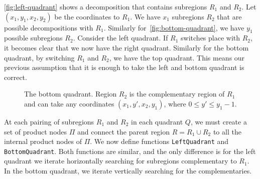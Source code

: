 \documentclass{amsart}
\theoremstyle{plain}
\numberwithin{equation}{section}
\newcommand{\code}[1]{\lstinline[mathescape=true]{#1}}
\begin{document}
\autoref{fig:left-quadrant} shows a decomposition that contains subregions $R_1$ and $R_2$. Let
$(x_1,y_1,x_2,y_2)$ be the coordinates to $R_1$. We have $x_1$ subregions $R_2$ that are possible
decompositions with $R_1$. Similarly for~\autoref{fig:bottom-quadrant}, we have $y_1$ possible
subregions $R_2$. Consider the left quadrant. If $R_1$ switches place with $R_2$, it becomes clear
that we now have the right quadrant. Similarly for the bottom quadrant, by switching $R_1$ and
$R_2$, we have the top quadrant. This means our previous assumption that it is enough to take the
left and bottom quadrant is correct.

\begin{figure}[h]
  \centering
  \captionsetup{justification=raggedright}
  \caption{The bottom quadrant. Region $R_2$ is the complementary region of $R_1$ and can take any
  coordinates $(x_1,y',x_2,y_1)$, where $0\leq y'\leq y_1-1$.\label{fig:bottom-quadrant}}
\end{figure}

At each pairing of subregions $R_1$ and $R_2$ in each quadrant $Q$, we must create a set of product
nodes $\Pi$ and connect the parent region $R=R_1\cup R_2$ to all the internal product nodes of
$\Pi$. We now define functions \code{LeftQuadrant} and \code{BottomQuadrant}. Both functions are
similar, and the only difference is for the left quadrant we iterate horizontally searching for
subregions complementary to $R_1$. In the bottom quadrant, we iterate vertically searching for the
complementaries.
\end{document}

